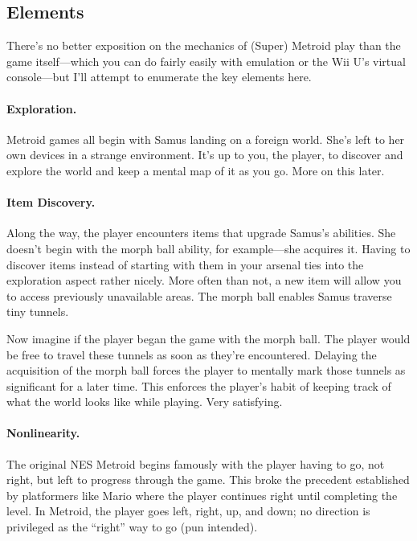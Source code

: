\documentclass{article}
\begin{document}
\subsection*{Elements}

There's no better exposition on the mechanics of (Super) Metroid play than the game itself---which you can do fairly easily with emulation or the Wii U's virtual console---but I'll attempt to enumerate the key elements here.

\paragraph{Exploration.} Metroid games all begin with Samus landing on a foreign world. She's left to her own devices in a strange environment. It's up to you, the player, to discover and explore the world and keep a mental map of it as you go. More on this later.

\paragraph{Item Discovery.} Along the way, the player encounters items that upgrade Samus's abilities. She doesn't begin with the morph ball ability, for example---she acquires it. Having to discover items instead of starting with them in your arsenal ties into the exploration aspect rather nicely. More often than not, a new item will allow you to access previously unavailable areas. The morph ball enables Samus traverse tiny tunnels.

Now imagine if the player began the game with the morph ball. The player would be free to travel these tunnels as soon as they're encountered. Delaying the acquisition of the morph ball forces the player to mentally mark those tunnels as significant for a later time. This enforces the player's habit of keeping track of what the world looks like while playing. Very satisfying.

\paragraph{Nonlinearity.} The original NES Metroid begins famously with the player having to go, not right, but left to progress through the game. This broke the precedent established by platformers like Mario where the player continues right until completing the level. In Metroid, the player goes left, right, up, and down; no direction is privileged as the ``right'' way to go (pun intended).
\end{document}
